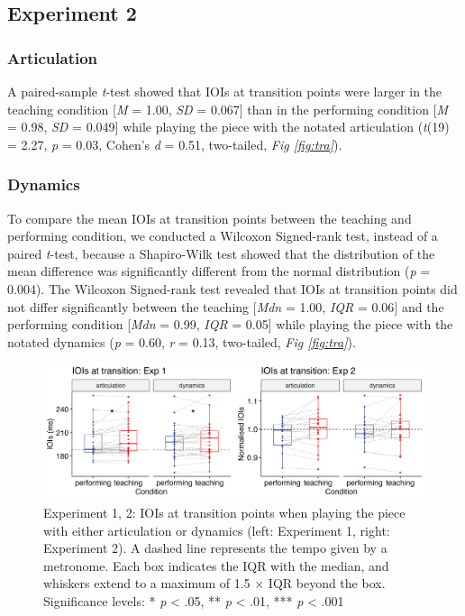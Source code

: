 \documentclass[
  man,floatsintext]{apa6}
\begin{document}
\hypertarget{experiment-2-3}{%
\subsection{Experiment 2}\label{experiment-2-3}}

\hypertarget{articulation-5}{%
\subsubsection{Articulation}\label{articulation-5}}

A paired-sample \emph{t}-test showed that IOIs at transition points were larger in the teaching condition {[}\emph{M} = 1.00, \emph{SD} = 0.067{]} than in the performing condition {[}\emph{M} = 0.98, \emph{SD} = 0.049{]} while playing the piece with the notated articulation (\emph{t}(19) = 2.27, \emph{p} = 0.03, Cohen's \emph{d} = 0.51, two-tailed, \emph{Fig \ref{fig:tra}}).

\hypertarget{dynamics-5}{%
\subsubsection{Dynamics}\label{dynamics-5}}

To compare the mean IOIs at transition points between the teaching and performing condition, we conducted a Wilcoxon Signed-rank test, instead of a paired \emph{t}-test, because a Shapiro-Wilk test showed that the distribution of the mean difference was significantly different from the normal distribution (\emph{p} = 0.004). The Wilcoxon Signed-rank test revealed that IOIs at transition points did not differ significantly between the teaching {[}\emph{Mdn} = 1.00, \emph{IQR} = 0.06{]} and the performing condition {[}\emph{Mdn} = 0.99, \emph{IQR} = 0.05{]} while playing the piece with the notated dynamics (\emph{p} = 0.60, \emph{r} = 0.13, two-tailed, \emph{Fig \ref{fig:tra}}).

\begin{figure}
\includegraphics[width=1\linewidth]{manuscript_files/figure-latex/plot-tra-1} \caption{\label{fig:tra}Experiment 1, 2: IOIs at transition points when playing the piece with either articulation or dynamics (left: Experiment 1, right: Experiment 2). A dashed line represents the tempo given by a metronome. Each box indicates the IQR with the median, and whiskers extend to a maximum of 1.5 × IQR beyond the box. Significance levels: * \textit{p} < .05, ** \textit{p} < .01, *** \textit{p} < .001}\label{fig:plot-tra}
\end{figure}
\end{document}

